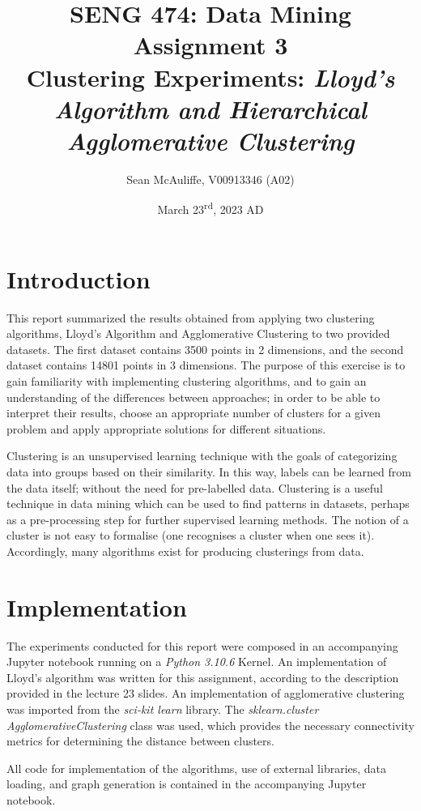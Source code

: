 \documentclass[12pt]{article}
\title{\textbf{SENG 474: Data Mining \\Assignment 3} \\[2ex]
\large Clustering Experiments: 
\large \textit{Lloyd's Algorithm and Hierarchical Agglomerative Clustering}}
\author{Sean McAuliffe, V00913346 (A02)}
\date{March 23\textsuperscript{rd}, 2023 AD}
\begin{document}
\maketitle

\pagebreak
\tableofcontents  
\pagebreak

\section{Introduction}

This report summarized the results obtained from applying two 
clustering algorithms, Lloyd's Algorithm and Agglomerative Clustering to two
provided datasets. The first dataset contains 3500 points in 2 dimensions, and
the second dataset contains 14801 points in 3 dimensions. The purpose of this
exercise is to gain familiarity with implementing clustering algorithms, and to
gain an understanding of the differences between approaches; in order to be
able to interpret their results, choose an appropriate number of clusters for
a given problem and apply appropriate solutions for different situations.

Clustering is an unsupervised learning technique with the goals of
categorizing data into groups based on their similarity. In this way, labels 
can be learned from the data itself; without the need for pre-labelled data.
Clustering is a useful technique in data mining which can be used to find 
patterns in datasets, perhaps as a pre-processing step for further supervised
learning methods. The notion of a cluster is not easy to formalise (one 
recognises a cluster when one sees it). Accordingly, many algorithms exist for
producing clusterings from data.

\section{Implementation}

The experiments conducted for this report were composed in an accompanying
Jupyter notebook running on a \emph{Python 3.10.6} Kernel. An implementation of
Lloyd's algorithm was written for this assignment, according to the description
provided in the lecture 23 slides. An implementation of agglomerative clustering
was imported from the \emph{sci-kit learn} library. The
\emph{sklearn.cluster AgglomerativeClustering} class was used, which provides
the necessary connectivity metrics for determining the distance between
clusters. 

All code for implementation of the algorithms, use of external libraries, data
loading, and graph generation is contained in the accompanying Jupyter notebook.
\end{document}
